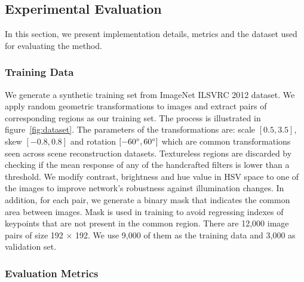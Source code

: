 \subsection{Experimental Evaluation}
\label{keynet_sec:experimental_evaluation}


In this section, we present implementation details, metrics and the dataset used for evaluating the method.

\subsubsection{Training Data}
\label{sec:create_dataset}

We generate a synthetic training set from ImageNet ILSVRC 2012 \cite{RussakovskyDSKSMHKKBBF14} dataset. We apply random geometric transformations to images and extract pairs of corresponding regions as our training set. The process is illustrated in figure~\ref{fig:dataset}. The parameters of the transformations are: scale $[0.5, 3.5]$, skew  $[-0.8, 0.8]$ and rotation $[-60^\circ, 60^\circ]$ which are common transformations seen across scene reconstruction datasets. Textureless regions are discarded by checking if the mean response of any of the handcrafted filters is lower than a threshold. We modify contrast, brightness and hue value in HSV space to one of the images to improve network's robustness against illumination changes. In addition, for each pair, we generate a binary mask that indicates the common area between images. Mask is used in training to avoid regressing indexes of keypoints that are not present in the common region. There are 12,000 image pairs of size 192 $\times$ 192. We use 9,000 of them as the training data and 3,000 as validation set.


\subsubsection{Evaluation Metrics}
\label{subsec:Evaluation}

